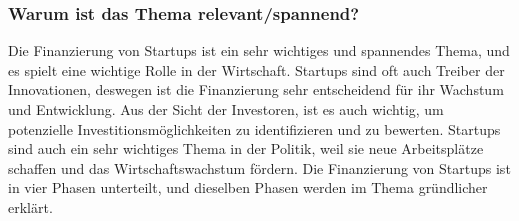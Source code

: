 \begin{refsection}
  \subsubsection*{Warum ist das Thema relevant/spannend?}
  Die Finanzierung von Startups ist ein sehr wichtiges und spannendes Thema, und es spielt eine wichtige Rolle in der Wirtschaft. Startups sind oft auch Treiber der Innovationen, deswegen ist die Finanzierung sehr entscheidend für ihr Wachstum und Entwicklung. Aus der Sicht der Investoren, ist es auch wichtig, um potenzielle Investitionsmöglichkeiten zu identifizieren und zu bewerten. Startups sind auch ein sehr wichtiges Thema in der Politik, weil sie neue Arbeitsplätze schaffen und das Wirtschaftswachstum fördern. Die Finanzierung von Startups ist in vier Phasen unterteilt, und dieselben Phasen werden im Thema gründlicher erklärt.
  \clearpage
  \printbibliography[heading=subsubbibliography]
\end{refsection}
\clearpage
